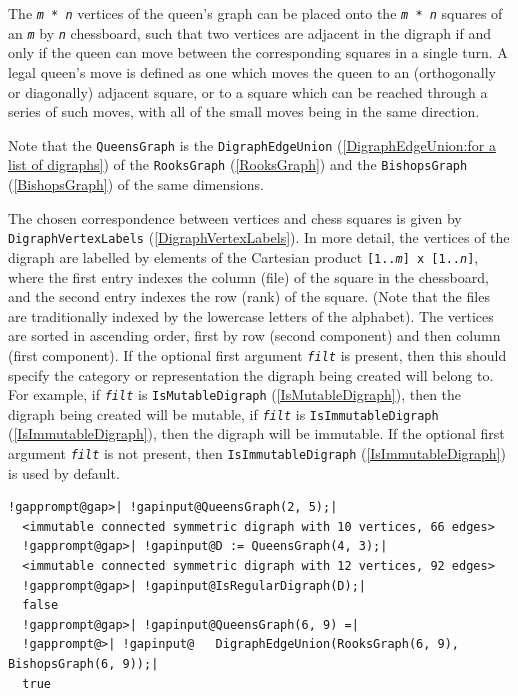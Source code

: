 \documentclass[a4paper,11pt]{report}
\begin{document}
{{{ The \texttt{\mbox{\texttt{\mdseries\slshape m}} * \mbox{\texttt{\mdseries\slshape n}}} vertices of the queen's graph can be placed onto the \texttt{\mbox{\texttt{\mdseries\slshape m}} * \mbox{\texttt{\mdseries\slshape n}}} squares of an \mbox{\texttt{\mdseries\slshape m}} by \mbox{\texttt{\mdseries\slshape n}} chessboard, such that two vertices are adjacent in the digraph if and only if
the queen can move between the corresponding squares in a single turn. A legal
queen's move is defined as one which moves the queen to an (orthogonally or
diagonally) adjacent square, or to a square which can be reached through a
series of such moves, with all of the small moves being in the same direction. 

 Note that the \texttt{QueensGraph} is the \texttt{DigraphEdgeUnion} (\ref{DigraphEdgeUnion:for a list of digraphs}) of the \texttt{RooksGraph} (\ref{RooksGraph}) and the \texttt{BishopsGraph} (\ref{BishopsGraph}) of the same dimensions. 

 The chosen correspondence between vertices and chess squares is given by \texttt{DigraphVertexLabels} (\ref{DigraphVertexLabels}). In more detail, the vertices of the digraph are labelled by elements of the
Cartesian product \texttt{[1..\mbox{\texttt{\mdseries\slshape m}}] x [1..\mbox{\texttt{\mdseries\slshape n}}]}, where the first entry indexes the column (file) of the square in the
chessboard, and the second entry indexes the row (rank) of the square. (Note
that the files are traditionally indexed by the lowercase letters of the
alphabet). The vertices are sorted in ascending order, first by row (second
component) and then column (first component). If the optional first argument \mbox{\texttt{\mdseries\slshape filt}} is present, then this should specify the category or representation the
digraph being created will belong to. For example, if \mbox{\texttt{\mdseries\slshape filt}} is \texttt{IsMutableDigraph} (\ref{IsMutableDigraph}), then the digraph being created will be mutable, if \mbox{\texttt{\mdseries\slshape filt}} is \texttt{IsImmutableDigraph} (\ref{IsImmutableDigraph}), then the digraph will be immutable. If the optional first argument \mbox{\texttt{\mdseries\slshape filt}} is not present, then \texttt{IsImmutableDigraph} (\ref{IsImmutableDigraph}) is used by default.

 
\begin{Verbatim}[commandchars=!@|,fontsize=\small,frame=single,label=Example]
  !gapprompt@gap>| !gapinput@QueensGraph(2, 5);|
  <immutable connected symmetric digraph with 10 vertices, 66 edges>
  !gapprompt@gap>| !gapinput@D := QueensGraph(4, 3);|
  <immutable connected symmetric digraph with 12 vertices, 92 edges>
  !gapprompt@gap>| !gapinput@IsRegularDigraph(D);|
  false
  !gapprompt@gap>| !gapinput@QueensGraph(6, 9) =|
  !gapprompt@>| !gapinput@   DigraphEdgeUnion(RooksGraph(6, 9), BishopsGraph(6, 9));|
  true
\end{Verbatim}
 }

}}
\end{document}
